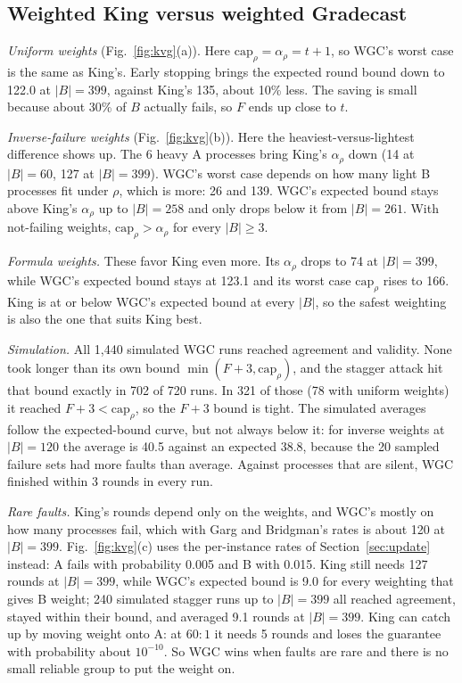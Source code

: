 \documentclass[conference]{IEEEtran}
\theoremstyle{definition}
\newcommand{\capr}{\mathrm{cap}_\rho}
\begin{document}
\subsection{Weighted King versus weighted Gradecast}
\emph{Uniform weights} (Fig.~\ref{fig:kvg}(a)). Here $\capr=\alpha_\rho=t+1$, so WGC's worst case is the same as King's. Early stopping brings the expected round bound down to 122.0 at $|B|=399$, against King's 135, about 10\% less. The saving is small because about 30\% of $B$ actually fails, so $F$ ends up close to $t$.

\emph{Inverse-failure weights} (Fig.~\ref{fig:kvg}(b)). Here the heaviest-versus-lightest difference shows up. The 6 heavy A processes bring King's $\alpha_\rho$ down (14 at $|B|=60$, 127 at $|B|=399$). WGC's worst case depends on how many light B processes fit under $\rho$, which is more: 26 and 139. WGC's expected bound stays above King's $\alpha_\rho$ up to $|B|=258$ and only drops below it from $|B|=261$. With not-failing weights, $\capr>\alpha_\rho$ for every $|B|\ge 3$.

\emph{Formula weights.} These favor King even more. Its $\alpha_\rho$ drops to 74 at $|B|=399$, while WGC's expected bound stays at 123.1 and its worst case $\capr$ rises to 166. King is at or below WGC's expected bound at every $|B|$, so the safest weighting is also the one that suits King best.

\emph{Simulation.} All 1{,}440 simulated WGC runs reached agreement and validity. None took longer than its own bound $\min(F+3,\capr)$, and the stagger attack hit that bound exactly in 702 of 720 runs. In 321 of those (78 with uniform weights) it reached $F+3<\capr$, so the $F+3$ bound is tight. The simulated averages follow the expected-bound curve, but not always below it: for inverse weights at $|B|=120$ the average is 40.5 against an expected 38.8, because the 20 sampled failure sets had more faults than average. Against processes that are silent, WGC finished within 3 rounds in every run.

\emph{Rare faults.} King's rounds depend only on the weights, and WGC's mostly on how many processes fail, which with Garg and Bridgman's rates is about 120 at $|B|=399$. Fig.~\ref{fig:kvg}(c) uses the per-instance rates of Section~\ref{sec:update} instead: A fails with probability 0.005 and B with 0.015. King still needs 127 rounds at $|B|=399$, while WGC's expected bound is 9.0 for every weighting that gives B weight; 240 simulated stagger runs up to $|B|=399$ all reached agreement, stayed within their bound, and averaged 9.1 rounds at $|B|=399$. King can catch up by moving weight onto A: at $60:1$ it needs 5 rounds and loses the guarantee with probability about $10^{-10}$. So WGC wins when faults are rare and there is no small reliable group to put the weight on.
\end{document}
